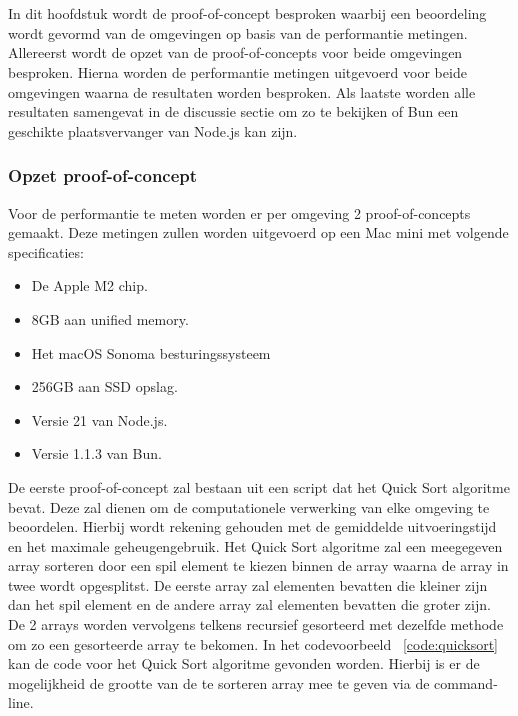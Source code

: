 \chapter{}%
\label{ch:proof-of-concept}

In dit hoofdstuk wordt de proof-of-concept besproken 
waarbij een beoordeling wordt gevormd van de omgevingen op basis van de performantie metingen.
Allereerst wordt de opzet van de proof-of-concepts voor beide omgevingen besproken.
Hierna worden de performantie metingen uitgevoerd voor beide omgevingen waarna de resultaten worden besproken.
Als laatste worden alle resultaten samengevat in de discussie sectie om zo te bekijken of Bun een geschikte plaatsvervanger
van Node.js kan zijn.

\subsection{Opzet proof-of-concept}
Voor de performantie te meten worden er per omgeving 2 proof-of-concepts gemaakt. 
Deze metingen zullen worden uitgevoerd op een Mac mini met volgende specificaties:
\begin{itemize}
  \item De Apple M2 chip.
  \item 8GB aan unified memory.
  \item Het macOS Sonoma besturingssysteem
  \item 256GB aan SSD opslag.
  \item Versie 21 van Node.js.
  \item Versie 1.1.3 van Bun.
\end{itemize}
De eerste proof-of-concept zal bestaan uit een script dat het Quick Sort algoritme bevat. 
Deze zal dienen om de computationele verwerking van elke omgeving te beoordelen. 
Hierbij wordt rekening gehouden met de gemiddelde uitvoeringstijd en het maximale geheugengebruik.
Het Quick Sort algoritme zal een meegegeven array sorteren door een spil element te kiezen binnen de array
waarna de array in twee wordt opgesplitst. De eerste array zal elementen bevatten die kleiner zijn dan het spil element 
en de andere array zal elementen bevatten die groter zijn. 
De 2 arrays worden vervolgens telkens recursief gesorteerd met dezelfde methode om zo een gesorteerde array te bekomen.
In het codevoorbeeld ~\ref{code:quicksort} kan de code voor het Quick Sort algoritme gevonden worden.
Hierbij is er de mogelijkheid de grootte van de te sorteren array mee te geven via de command-line.

